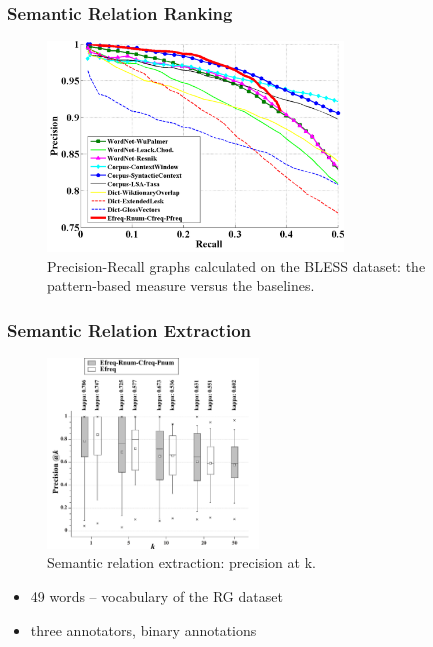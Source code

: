 \documentclass{beamer}
\begin{document}
\begin{frame}
\frametitle{Semantic Relation Ranking}

\begin{figure}	
	\centering
	\includegraphics[width=0.7\textwidth]{figures/pr2-mlg}
	\caption{Precision-Recall graphs calculated on the BLESS dataset: the pattern-based measure versus the baselines.
	}
\end{figure}

\end{frame}

\begin{frame}
\frametitle{Semantic Relation Extraction}

\begin{figure}	
	\centering
	\includegraphics[width=0.5\textwidth]{figures/b}
	\caption{Semantic relation extraction: precision at k.}
\end{figure}

\begin{itemize}
  \item 49 words  -- vocabulary of the RG dataset
  \item three annotators, binary annotations  
\end{itemize}

\end{frame}
\end{document}
